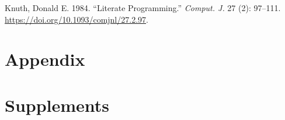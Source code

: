 \documentclass[
  letterpaper,
  DIV=11,
  numbers=noendperiod]{scrartcl}
\newlength{\cslhangindent}
\newenvironment{CSLReferences}[2] %
 {\begin{list}{}{%
  \setlength{\itemindent}{0pt}
  \setlength{\leftmargin}{0pt}
  \setlength{\parsep}{0pt}
  \ifodd #1
   \setlength{\leftmargin}{\cslhangindent}
   \setlength{\itemindent}{-1\cslhangindent}
  \fi
  \setlength{\itemsep}{#2\baselineskip}}}
 {\end{list}}
\begin{document}
\label{refs}
\begin{CSLReferences}{1}{0}
Knuth, Donald E. 1984. {``Literate Programming.''} \emph{Comput. J.} 27
(2): 97--111. \url{https://doi.org/10.1093/comjnl/27.2.97}.

\end{CSLReferences}

\section{Appendix}\label{appendix}

\section{Supplements}\label{supplements}
\end{document}
